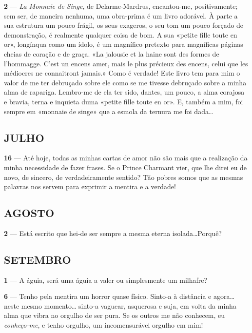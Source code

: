 \textbf{2} — \textit{La Monnaie de Singe}, de Delarme-Mardrus,
encantou-me, positivamente; sem ser, de maneira 
nenhuma, uma obra-prima é um livro adorável. À parte a
sua estrutura um pouco frágil, os seus exageros, o seu
tom um pouco forçado de demonstração, é realmente
qualquer coisa de bom. A sua «petite fille toute en or»,
longínqua como um ídolo, é um magnífico pretexto para
magníficas páginas cheias de coração e de graça. «La
jalousie et la haine sont des formes de l’hommagge.
C’est un encens amer, mais le plus précieux des encens,
celui que les médiocres ne connaitront jamais.» Como
é verdade! Este livro tem para mim o valor de me ter
debruçado sobre ele como se me tivesse debruçado sobre
a minha alma de rapariga. Lembro-me de ela ter sido,
dantes, um pouco, a alma corajosa e bravia, terna e
inquieta duma «petite fille toute en or». E, também a
mim, foi sempre em «monnaie de singe» que a esmola
da ternura me foi dada\ldots


\pagebreak


\subsection{JULHO}

\textbf{16} — Até hoje, todas as minhas cartas de amor não
são mais que a realização da minha necessidade de fazer
frases. Se o Prince Charmant vier, que lhe direi eu
de novo, de sincero, de verdadeiramente sentido? Tão
pobres somos que as mesmas palavras nos servem para
exprimir a mentira e a verdade!

\subsection{AGOSTO}

\textbf{2} — Está escrito que hei-de ser sempre a mesma eterna
isolada\ldots Porquê?

\subsection{SETEMBRO}

\textbf{1} — A águia, será uma águia a valer ou simplesmente
um milhafre?

\textbf{6} — Tenho pela mentira um horror quase físico. 
Sinto-a à distância e agora\ldots neste mesmo momento\ldots
sinto-a vaguear, asquerosa e suja, em volta da minha
alma que vibra no orgulho de ser pura. Se os outros
me não conhecem, eu \textit{conheço-me}, e tenho orgulho,
um incomensurável orgulho em mim!

